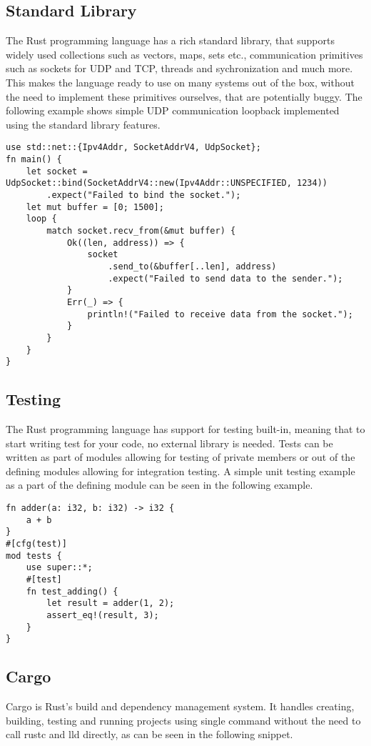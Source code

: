\subsection{Standard Library}
\label{subsec:std_lib}
The Rust programming language has a rich standard library, that supports widely used collections such as vectors, maps, sets etc., communication primitives such as sockets for UDP and TCP, threads and sychronization and much more.
This makes the language ready to use on many systems out of the box, without the need to implement these primitives ourselves, that are potentially buggy.
The following example shows simple UDP communication loopback implemented using the standard library features.

\begin{lstlisting}
use std::net::{Ipv4Addr, SocketAddrV4, UdpSocket};
fn main() {
    let socket = UdpSocket::bind(SocketAddrV4::new(Ipv4Addr::UNSPECIFIED, 1234))
        .expect("Failed to bind the socket.");
    let mut buffer = [0; 1500];
    loop {
        match socket.recv_from(&mut buffer) {
            Ok((len, address)) => {
                socket
                    .send_to(&buffer[..len], address)
                    .expect("Failed to send data to the sender.");
            }
            Err(_) => {
                println!("Failed to receive data from the socket.");
            }
        }
    }
}
\end{lstlisting}

\subsection{Testing}
\label{subsec:testing}
The Rust programming language has support for testing built-in, meaning that to start writing test for your code, no external library is needed.
Tests can be written as part of modules allowing for testing of private members or out of the defining modules allowing for integration testing.
A simple unit testing example as a part of the defining module can be seen in the following example.

\begin{lstlisting}
fn adder(a: i32, b: i32) -> i32 {
    a + b
}
#[cfg(test)]
mod tests {
    use super::*;
    #[test]
    fn test_adding() {
        let result = adder(1, 2);
        assert_eq!(result, 3);
    }
}
\end{lstlisting}

\newpage
\subsection{Cargo}
\label{subsec:cargo}
Cargo is Rust's build and dependency management system.
It handles creating, building, testing and running projects using single command without the need to call rustc and lld directly, as can be seen in the following snippet.

